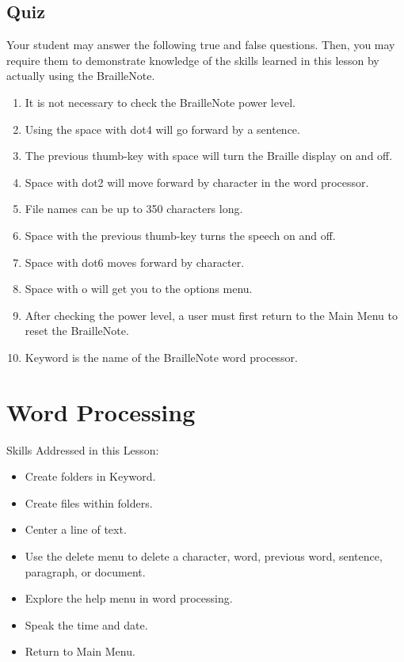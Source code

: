 \documentclass[10pt,letterpaper,twoside]{report}
\begin{document}
{{{\subsection{Quiz}
Your student may answer the following true and false questions.  Then, you may require them to demonstrate knowledge of the skills learned in this lesson by actually using the BrailleNote.
\begin{enumerate}
	\item It is not necessary to check the BrailleNote power level.
	\item Using the space with dot4 will go forward by a sentence.
	\item The previous thumb-key with space will turn the Braille display on and off.
	\item Space with dot2 will move forward by character in the word processor.
	\item File names can be up to 350 characters long.
	\item Space with the previous thumb-key turns the speech on and off.
	\item Space with dot6 moves forward by character.
	\item Space with o will get you to the options menu.
	\item After checking the power level, a user must first return to the Main Menu to reset the BrailleNote.
	\item Keyword is the name of the BrailleNote word processor.
\end{enumerate}

\clearpage
\section{ Word Processing}
Skills Addressed in this Lesson:
\begin{itemize}
	\item Create folders in Keyword.
	\item Create files within folders.
	\item Center a line of text.
	\item Use the delete menu to delete a character, word, previous word, sentence, paragraph, or document.
	\item Explore the help menu in word processing.
	\item Speak the time and date.
	\item Return to Main Menu.
\end{itemize}

}}}
\end{document}
